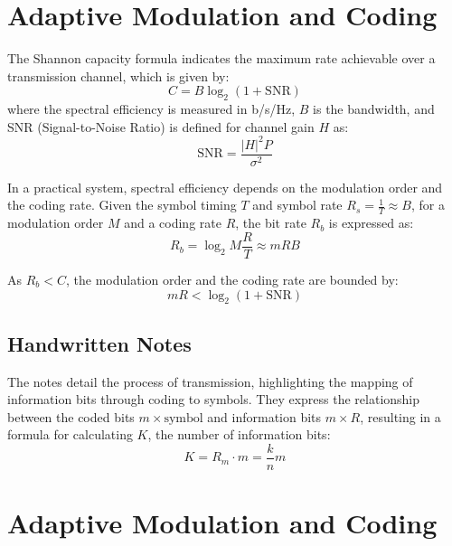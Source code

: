 \section*{Adaptive Modulation and Coding}

The Shannon capacity formula indicates the maximum rate achievable over a transmission channel, which is given by:
\begin{equation}
    C = B\log_2(1 + \text{SNR})
\end{equation}
where the spectral efficiency is measured in b/s/Hz, \( B \) is the bandwidth, and SNR (Signal-to-Noise Ratio) is defined for channel gain \( H \) as:
\begin{equation}
    \text{SNR} = \frac{|H|^2P}{\sigma^2}
\end{equation}

In a practical system, spectral efficiency depends on the modulation order and the coding rate. Given the symbol timing \( T \) and symbol rate \( R_s = \frac{1}{T} \approx B \), for a modulation order \( M \) and a coding rate \( R \), the bit rate \( R_b \) is expressed as:
\begin{equation}
    R_b = \log_2 M \frac{R}{T} \approx mRB
\end{equation}

As \( R_b < C \), the modulation order and the coding rate are bounded by:
\begin{equation}
    mR < \log_2(1 + \text{SNR})
\end{equation}

\subsection*{Handwritten Notes}
The notes detail the process of transmission, highlighting the mapping of information bits through coding to symbols. They express the relationship between the coded bits \( m \times \text{symbol} \) and information bits \( m \times R \), resulting in a formula for calculating \( K \), the number of information bits:
\begin{equation}
    K = R_m \cdot m = \frac{k}{n} m
\end{equation}






\section*{Adaptive Modulation and Coding}

